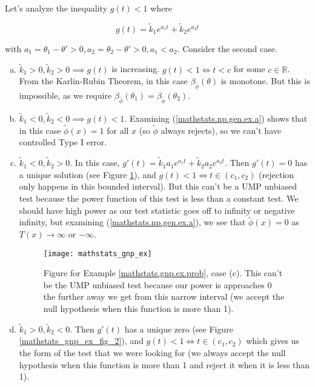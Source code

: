 \begin{solution}
Let's analyze the inequality \(g(t) < 1\) where 

\[
g(t) =  \tilde{k}_1e^{a_1 t } + \tilde{k}_2e^{a_2 t}
\]

with \(a_1 = \theta_1 - \theta' > 0, a_2 = \theta_2 - \theta' > 0, a_1 < a_2\). Consider the second case.

\begin{enumerate}[(a)]

\item \(\tilde{k}_1 > 0, \tilde{k}_2 > 0 \implies g(t)\) is increasing. \(g(t) < 1 \iff t< c\) for some \(c \in \mathbb{R}\). From the Karlin-Rubin Theorem, in this case \(\beta_{\tilde{\phi}}(\theta) \) is monotone. But this is impossible, as we require \(\beta_{\tilde{\phi}}(\theta_1) =  \beta_{\tilde{\phi}}(\theta_2)\).

\item \(\tilde{k}_1 < 0, \tilde{k}_2 < 0 \implies g(t) < 1\). Examining (\ref{mathstats.np.gen.ex.a}) shows that in this case \(\tilde{\phi}(x) = 1\) for all \(x\) (so \(\tilde{\phi}\) always rejects), so we can't have controlled Type I error.

\item \(\tilde{k}_1 < 0, \tilde{k}_2 > 0\). In this case, \(g'(t) = \tilde{k}_1 a_1 e^{a_1 t} + \tilde{k}_2 a_2 e^{a_2 t}\). Then \(g'(t) = 0\) has a unique solution (see Figure \ref{mathstats_gnp_ex_fig}), and \(g(t) < 1 \iff t \in (c_1, c_2)\) (rejection only happens in this bounded interval). But this can't be a UMP unbiased test because the power function of this test is less than a constant test. We should have high power as our test statistic goes off to infinity or negative infinity, but examining (\ref{mathstats.np.gen.ex.a}), we see that \(\tilde{\phi}(x)= 0\) as \(T(x) \to \infty\) or \(- \infty\).

\begin{figure}[htbp]
\begin{center}
\texttt{[image: mathstats\_gnp\_ex]}
\caption{Figure for Example \ref{mathstats.gnp.ex.prob}, case (c). This can't be the UMP unbiased test because our power is approaches 0 the further away we get from this narrow interval (we accept the null hypothesis when this function is more than 1).}
\label{mathstats_gnp_ex_fig}
\end{center}
\end{figure}

\item \(\tilde{k}_1 > 0, \tilde{k}_2 < 0\). Then \(g'(t)\) has a unique zero (see Figure \ref{mathstats_gnp_ex_fig_2}), and \(g(t) < 1 \iff t \in (c_1, c_2)\) which gives us the form of the test that we were looking for (we always accept the null hypothesis when this function is more than 1 and reject it when it is less than 1).


\end{enumerate}
\end{solution}
